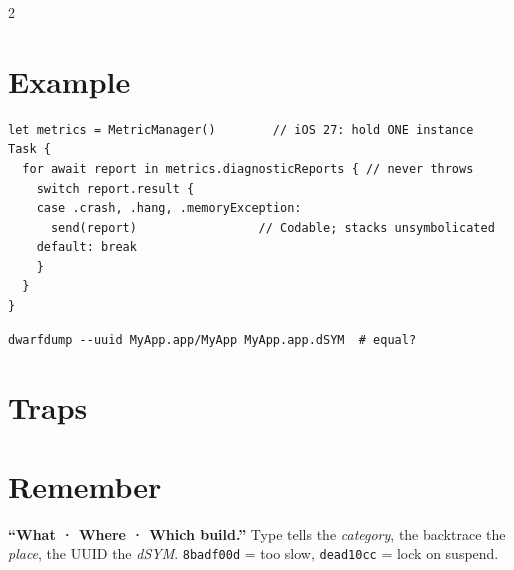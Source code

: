 \documentclass[8pt]{extarticle}
\begin{document}
\begin{multicols}{2}
\columnbreak

\section{Example}
\begin{lstlisting}[language=SwiftSheet]
let metrics = MetricManager()        // iOS 27: hold ONE instance
Task {
  for await report in metrics.diagnosticReports { // never throws
    switch report.result {
    case .crash, .hang, .memoryException:
      send(report)                 // Codable; stacks unsymbolicated
    default: break
    }
  }
}
\end{lstlisting}
\begin{lstlisting}[style=plain]
dwarfdump --uuid MyApp.app/MyApp MyApp.app.dSYM  # equal?
\end{lstlisting}

\section{Traps}
\begin{itemize}
\end{itemize}

\section{Remember}
\textbf{``What · Where · Which build.''} Type tells the \emph{category}, the backtrace the
\emph{place}, the UUID the \emph{dSYM}. \texttt{8badf00d} = too slow, \texttt{dead10cc} = lock on suspend.


\end{multicols}

\end{document}
